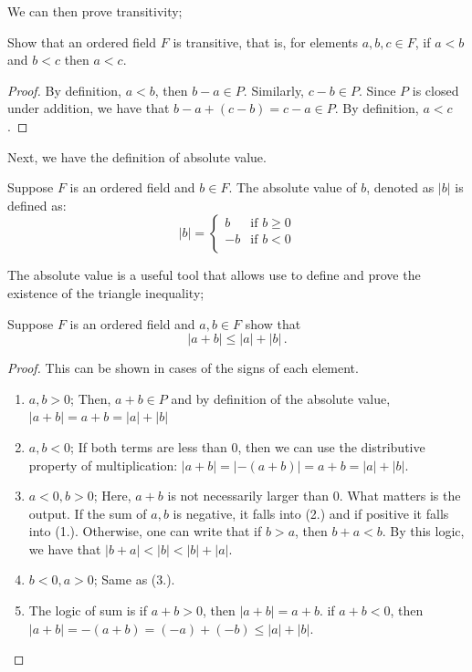 We can then prove transitivity;

\begin{problem}
    Show that an ordered field $F$ is transitive, that is, for elements $a,b,c \in F$, if $a < b$ and $b < c$ then $ a < c$.
\end{problem}
\begin{proof}
    By definition, $a < b$, then $b - a \in P$. Similarly, $c - b \in P$. Since $P$ is closed under addition, we have that $b - a + (c - b) = c - a \in P$. By definition, $a < c$.
\end{proof}

Next, we have the definition of absolute value. 
\begin{definition}
    Suppose $F$ is an ordered field and $b\in F$. The absolute value of $b$, denoted as $|b|$ is defined as:
    \begin{equation}
        |b| = 
        \begin{cases}
        b & \text{if }b \geq 0 \\ 
        -b & \text{if }b < 0 \\   
        \end{cases}
    \end{equation}
\end{definition}

The absolute value is a useful tool that allows use to define and prove the existence of the triangle inequality;
\begin{problem}
    Suppose $F$ is an ordered field and $a,b \in F$ show that 
    \begin{equation}
        |a + b| \leq |a| + |b|\,.
    \end{equation}
\end{problem}
\begin{proof}\label{proof:triangle_inequality}
    This can be shown in cases of the signs of each element.
    \begin{enumerate}
        \item $a, b > 0$; Then, $a + b \in P$ and by definition of the absolute value, $|a + b| = a + b = |a| + |b|$
        \item $a, b < 0$; If both terms are less than 0, then we can use the distributive property of multiplication: $|a + b| = |-(a + b)| = a + b = |a| + |b|$.
        \item $a < 0, b > 0$; Here, $a + b$ is not necessarily larger than 0. What matters is the output. If the sum of $a,b$ is negative, it falls into (2.) and if positive it falls into (1.). Otherwise, one can write that  if $b > a$, then $b + a < b$. By this logic, we have that $|b + a| < |b| < |b| + |a|$.
        \item $b < 0, a > 0$; Same as (3.).
        \item The logic of sum is if $a + b >0$, then $|a + b| = a + b$. if $a + b < 0$, then $|a + b| = -(a + b) = (-a) + (-b) \leq |a| + |b|$. 
    \end{enumerate} 
\end{proof}

